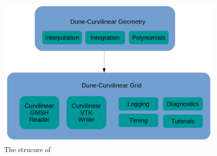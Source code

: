 \begin{figure}[H]
    \centering
    \includegraphics[scale=0.15]{images/curvgrid-map}
    \caption{The strucure of \curvgrid{}}
    \label{fig:introduction:curvgrid:structure}
\end{figure}

